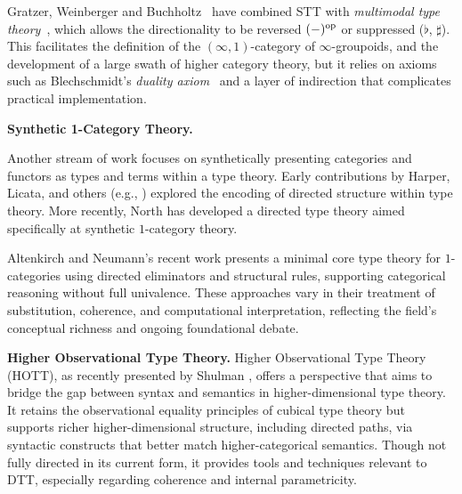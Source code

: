 \documentclass[a4paper,11pt]{article}
\renewcommand{\paragraph}[1]{\textbf{#1.}}
\begin{document}
Gratzer, Weinberger and Buchholtz~\cite{gratzer2024directed,gratzer2025yoneda} have combined STT with \emph{multimodal type theory}~\cite{gratzer:2020}, which allows
the directionality to be reversed $(-)^{\textup{op}}$ or suppressed (\(\flat\), \(\sharp\)).
This facilitates the definition of the $(\infty,1)$-category of $\infty$-groupoids,
and the development of a large swath of higher category theory, but it relies on axioms
such as Blechschmidt's \emph{duality axiom}~\cite{blechschmidt:2023}
and a layer of
indirection that complicates practical implementation.

\paragraph{Synthetic 1-Category Theory}

Another stream of work focuses on synthetically presenting categories
and functors as types and terms within a type theory. Early
contributions by Harper, Licata, and others (e.g., \cite{licata:2011})
explored the encoding of directed structure within type theory. More
recently, North has developed a directed type theory \cite{north_2019}
aimed specifically at synthetic $1$-category theory.

Altenkirch and Neumann’s recent work
\cite{altenkirch_neumann_2024} presents a minimal core type theory for
$1$-categories using directed eliminators and structural rules,
supporting categorical reasoning without full univalence. These
approaches vary in their treatment of substitution, coherence, and
computational interpretation, reflecting the field's conceptual
richness and ongoing foundational debate.

\paragraph{Higher Observational Type Theory}
Higher Observational Type Theory (HOTT), as recently presented by
Shulman \cite{shulman2022}, offers a perspective that aims to bridge
the gap between syntax and semantics in higher-dimensional type
theory. It retains the observational equality principles of cubical
type theory but supports richer higher-dimensional structure,
including directed paths, via syntactic constructs that better match
higher-categorical semantics. Though not fully directed in its current
form, it provides tools and techniques relevant to DTT, especially
regarding coherence and internal parametricity.
\end{document}
